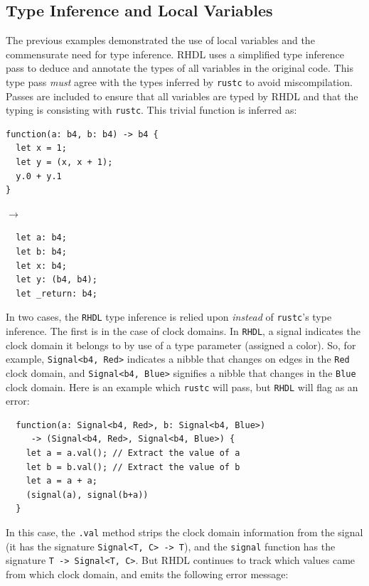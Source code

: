 \documentclass[sigplan,screen,sigconf]{acmart}
\begin{document}
\subsection{Type Inference and Local Variables}
The previous examples demonstrated the use of local variables and the commensurate need for type inference.  RHDL uses a simplified type inference pass to deduce and annotate the types of all variables in the original code.  This type pass \emph{must} agree with the types inferred by \verb|rustc| to avoid miscompilation.  Passes are included to ensure that all variables are typed by RHDL and that the typing is consisting with \verb|rustc|.  This trivial function is inferred as:
\begin{center}
\begin{minipage}{4cm}
\begin{verbatim}
function(a: b4, b: b4) -> b4 {
  let x = 1;
  let y = (x, x + 1);
  y.0 + y.1
}
\end{verbatim}
\end{minipage}
$\rightarrow$
\begin{minipage}{4cm}
\begin{verbatim}
  let a: b4;
  let b: b4;
  let x: b4;
  let y: (b4, b4);
  let _return: b4;
\end{verbatim}
\end{minipage}
\end{center}

In two cases, the \verb|RHDL| type inference is relied upon \emph{instead} of \verb|rustc|'s type inference.  The first is in the case of clock domains.  In \verb|RHDL|, a signal indicates the clock domain it belongs to by use of a type parameter (assigned a color).  So, for example, \verb|Signal<b4, Red>| indicates a nibble that changes on edges in the \verb|Red| clock domain, and \verb|Signal<b4, Blue>| signifies a nibble that changes in the \verb|Blue| clock domain.   Here is an example
which \verb|rustc| will pass, but \verb|RHDL| will flag as an error:
\begin{verbatim}
  function(a: Signal<b4, Red>, b: Signal<b4, Blue>) 
     -> (Signal<b4, Red>, Signal<b4, Blue>) {
    let a = a.val(); // Extract the value of a
    let b = b.val(); // Extract the value of b
    let a = a + a;
    (signal(a), signal(b+a))
  }
\end{verbatim}
In this case, the \verb|.val| method strips the clock domain information from the signal (it has the signature \verb|Signal<T, C> -> T|), and
the \verb|signal| function has the signature \verb|T -> Signal<T, C>|.
But RHDL continues to track which values came from which clock domain, and emits the following error message:
\end{document}
